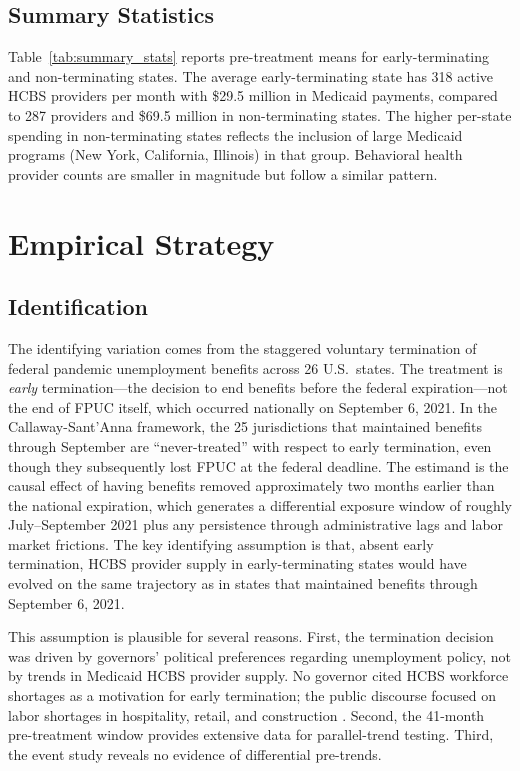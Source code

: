 \documentclass[12pt]{article}
\begin{document}
\subsection{Summary Statistics}

Table~\ref{tab:summary_stats} reports pre-treatment means for early-terminating and non-terminating states. The average early-terminating state has 318 active HCBS providers per month with \$29.5 million in Medicaid payments, compared to 287 providers and \$69.5 million in non-terminating states. The higher per-state spending in non-terminating states reflects the inclusion of large Medicaid programs (New York, California, Illinois) in that group. Behavioral health provider counts are smaller in magnitude but follow a similar pattern.




\section{Empirical Strategy}

\subsection{Identification}

The identifying variation comes from the staggered voluntary termination of federal pandemic unemployment benefits across 26 U.S.\ states. The treatment is \textit{early} termination---the decision to end benefits before the federal expiration---not the end of FPUC itself, which occurred nationally on September 6, 2021. In the Callaway-Sant'Anna framework, the 25 jurisdictions that maintained benefits through September are ``never-treated'' with respect to early termination, even though they subsequently lost FPUC at the federal deadline. The estimand is the causal effect of having benefits removed approximately two months earlier than the national expiration, which generates a differential exposure window of roughly July--September 2021 plus any persistence through administrative lags and labor market frictions. The key identifying assumption is that, absent early termination, HCBS provider supply in early-terminating states would have evolved on the same trajectory as in states that maintained benefits through September 6, 2021.

This assumption is plausible for several reasons. First, the termination decision was driven by governors' political preferences regarding unemployment policy, not by trends in Medicaid HCBS provider supply. No governor cited HCBS workforce shortages as a motivation for early termination; the public discourse focused on labor shortages in hospitality, retail, and construction \citep{holzer2021}. Second, the 41-month pre-treatment window provides extensive data for parallel-trend testing. Third, the event study reveals no evidence of differential pre-trends.
\end{document}
